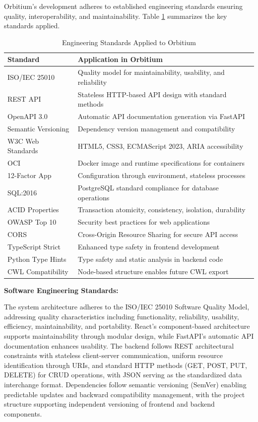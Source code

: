 \documentclass[12pt]{article}
\begin{document}
Orbitium's development adheres to established engineering standards ensuring quality, interoperability, and maintainability. Table \ref{tab:engineering_standards} summarizes the key standards applied.

\begin{table}[h]
\centering
\caption{Engineering Standards Applied to Orbitium}
\label{tab:engineering_standards}
\begin{tabular}{|l|p{9cm}|}
\hline
\textbf{Standard} & \textbf{Application in Orbitium} \\
\hline
ISO/IEC 25010 & Quality model for maintainability, usability, and reliability \\
REST API & Stateless HTTP-based API design with standard methods \\
OpenAPI 3.0 & Automatic API documentation generation via FastAPI \\
Semantic Versioning & Dependency version management and compatibility \\
W3C Web Standards & HTML5, CSS3, ECMAScript 2023, ARIA accessibility \\
OCI & Docker image and runtime specifications for containers \\
12-Factor App & Configuration through environment, stateless processes \\
SQL:2016 & PostgreSQL standard compliance for database operations \\
ACID Properties & Transaction atomicity, consistency, isolation, durability \\
OWASP Top 10 & Security best practices for web applications \\
CORS & Cross-Origin Resource Sharing for secure API access \\
TypeScript Strict & Enhanced type safety in frontend development \\
Python Type Hints & Type safety and static analysis in backend code \\
CWL Compatibility & Node-based structure enables future CWL export \\
\hline
\end{tabular}
\end{table}

\textbf{Software Engineering Standards:}

The system architecture adheres to the ISO/IEC 25010 Software Quality Model, addressing quality characteristics including functionality, reliability, usability, efficiency, maintainability, and portability. React's component-based architecture supports maintainability through modular design, while FastAPI's automatic API documentation enhances usability. The backend follows REST architectural constraints with stateless client-server communication, uniform resource identification through URIs, and standard HTTP methods (GET, POST, PUT, DELETE) for CRUD operations, with JSON serving as the standardized data interchange format. Dependencies follow semantic versioning (SemVer) enabling predictable updates and backward compatibility management, with the project structure supporting independent versioning of frontend and backend components.
\end{document}
